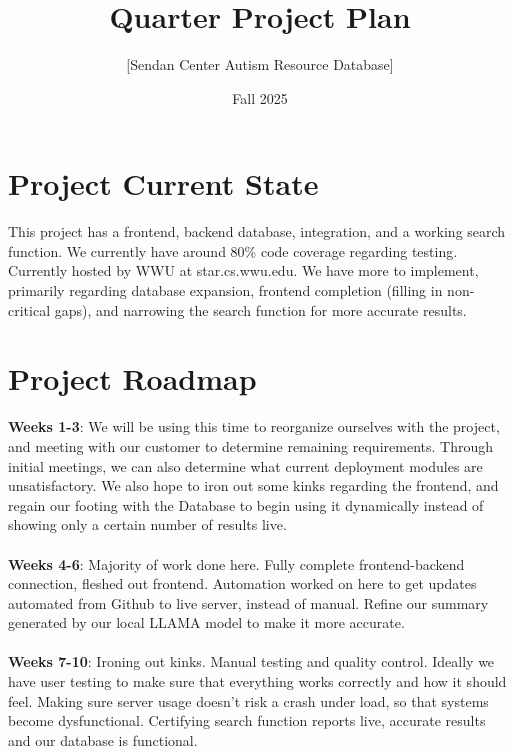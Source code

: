 \documentclass{article}
\title{Quarter Project Plan}
\author{[Sendan Center Autism Resource Database]}
\date{Fall 2025}
\begin{document}
\maketitle


\section*{Project Current State}
This project has a frontend, backend database, integration, and a working search function. We currently have around 80\% code coverage regarding testing. Currently hosted by WWU at star.cs.wwu.edu. We have more to implement, primarily regarding database expansion, frontend completion (filling in non-critical gaps), and narrowing the search function for more accurate results.

\section*{Project Roadmap}
\textbf{Weeks 1-3}: We will be using this time to reorganize ourselves with the project, and meeting with our customer to determine remaining requirements. Through initial meetings, we can also determine what current deployment modules are unsatisfactory. We also hope to iron out some kinks regarding the frontend, and regain our footing with the Database to begin using it dynamically instead of showing only a certain number of results live. 
\\\\
\textbf{Weeks 4-6}: Majority of work done here. Fully complete frontend-backend connection, fleshed out frontend. Automation worked on here to get updates automated from Github to live server, instead of manual. Refine our summary generated by our local LLAMA model to make it more accurate. 
\\\\
\textbf{Weeks 7-10}: Ironing out kinks. Manual testing and quality control. Ideally we have user testing to make sure that everything works correctly and how it should feel. Making sure server usage doesn't risk a crash under load, so that systems become dysfunctional. Certifying search function reports live, accurate results and our database is functional.
\end{document}
